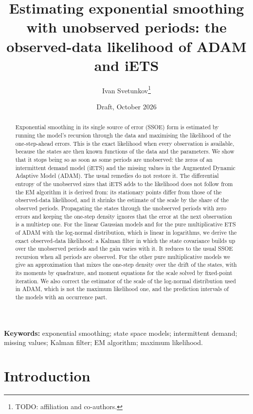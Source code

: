 \documentclass[11pt,a4paper]{article}
\title{Estimating exponential smoothing with unobserved periods: the observed-data
likelihood of ADAM and iETS}
\author{Ivan Svetunkov\thanks{TODO: affiliation and co-authors.}}
\date{Draft, October 2026}
\theoremstyle{remark}
\begin{document}
\maketitle

\begin{abstract}
Exponential smoothing in its single source of error (SSOE) form is estimated by running the
model's recursion through the data and maximising the likelihood of the one-step-ahead errors.
This is the exact likelihood when every observation is available, because the states are then
known functions of the data and the parameters. We show that it stops being so as soon as some
periods are unobserved: the zeros of an intermittent demand model (iETS) and the missing values
in the Augmented Dynamic Adaptive Model (ADAM). The usual remedies do not restore it. The
differential entropy of the unobserved sizes that iETS adds to the likelihood does not follow
from the EM algorithm it is derived from: its stationary points differ from those of the
observed-data likelihood, and it shrinks the estimate of the scale by the share of the observed
periods. Propagating the states through the unobserved periods with zero errors and keeping the
one-step density ignores that the error at the next observation is a multistep one. For the linear
Gaussian models and for the pure multiplicative ETS of ADAM with the log-normal distribution, which
is linear in logarithms, we derive the exact observed-data likelihood: a Kalman filter in which the
state covariance builds up over the unobserved periods and the gain varies with it. It reduces to
the usual SSOE recursion when all periods are observed. For the other pure multiplicative models
we give an approximation that mixes the one-step density over the drift of the states, with its
moments by quadrature, and moment equations for the scale solved by fixed-point iteration. We also
correct the estimator of the scale of the log-normal distribution used in ADAM, which is not the
maximum likelihood one, and the prediction intervals of the models with an occurrence part.
\end{abstract}

\noindent\textbf{Keywords:} exponential smoothing; state space models; intermittent demand;
missing values; Kalman filter; EM algorithm; maximum likelihood.

\section{Introduction}
\label{sec:intro}
\end{document}

